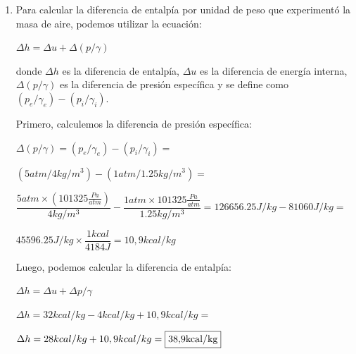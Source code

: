\documentclass[../main]{subfiles}
\begin{document}
\begin{enumerate}
Como nos da un valor positivo significa que el gas también aumenta su temperatura.

Para la transformación abierta 1- 2 - 3 también aplicamos: 

$Q_{1-2-3} =\Delta U_{1-2-3} + A W_{1-2-3}$

Pero aquí no tenemos como dato el valor de $Q_{1-2-3}$ solo el del trabajo $W_{1-2-3}$

Para poder resolver sabemos que la energía interna en un punto es única por lo tanto a diferencia del trabajo por cualquiera que sea el camino es $\Delta U_{1-3} = \Delta U_{1-2-3}$
 
 $Q_{1-3} = \Delta U1-3 + A W1-3$

 $Q_{1-3} = 683 Kcal + 0,00234 \times 10000 kgm$
 
 $Q_{1-3} = 683 Kcal + 23,4 Kcal = 706,4 Kcal$

Como nos da un valor positivo significa que el gas también aumenta su temperatura 

\item Para calcular la diferencia de entalpía por unidad de peso que experimentó la masa de aire, podemos utilizar la ecuación:

$\Delta h = \Delta u + \Delta (p/\gamma)$

donde $\Delta h$ es la diferencia de entalpía, $\Delta u$ es la diferencia de energía interna, $\Delta (p/\gamma)$ es la diferencia de presión específica y se define como $(p_e/\gamma_e) - (p_i/\gamma_i)$.

Primero, calculemos la diferencia de presión específica:

$\Delta (p/\gamma) = (p_e/\gamma_e) - (p_i/\gamma_i) =$

$ (5 atm / 4 kg/m^3) - (1 atm / 1.25 kg/m^3) =$

$\dfrac{5 atm \times (101325\frac{Pa}{atm})} { 4 kg/m^3} - \dfrac{1 atm \times 101325\frac{Pa}{atm}}{ 1.25 kg/m^3} =126656.25 J/kg - 81060J/kg=$

$45596.25J/kg \times \dfrac{1kcal}{4184J}=10,9kcal/kg$

Luego, podemos calcular la diferencia de entalpía:

$\Delta h= \Delta u + \Delta p/\gamma$

$\Delta h=32kcal/kg-4kcal/kg + 10,9 kcal/kg =$

$\Delta h=28kcal/kg + 10,9kcal/kg=\fbox{38,9kcal/kg}$



 
\end{enumerate}
\end{document}
